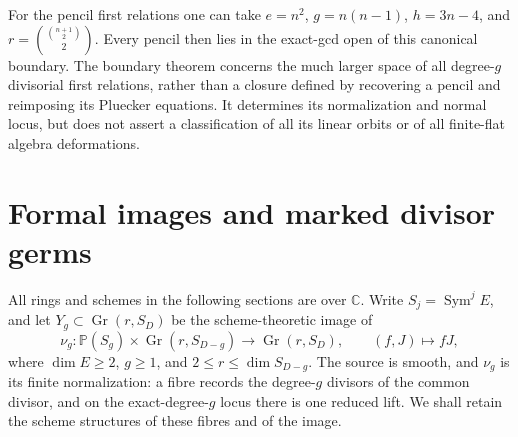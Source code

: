 \documentclass[11pt,reqno]{amsart}
\numberwithin{equation}{section}
\theoremstyle{definition}\newtheorem{definition}[theorem]{Definition}
\theoremstyle{remark}\newtheorem{remark}[theorem]{Remark}
\newcommand{\C}{\mathbb C}\newcommand{\Q}{\mathbb Q}
\newcommand{\Pj}{\mathbb P}\newcommand{\A}{\mathbb A}
\DeclareMathOperator{\Sym}{Sym}\DeclareMathOperator{\Gr}{Gr}
\begin{document}
For the pencil first relations one can take
\(e=n^2\), \(g=n(n-1)\), \(h=3n-4\), and
\(r=\binom{\binom{n+1}{2}}2\).  Every pencil then lies in the
exact-gcd open of this canonical boundary.  The boundary theorem
concerns the much larger space of all degree-\(g\) divisorial first
relations, rather than a closure defined by recovering a pencil and
reimposing its Pluecker equations.  It determines its normalization
and normal locus, but does not assert a classification of all its
linear orbits or of all finite-flat algebra deformations.


\section{Formal images and marked divisor germs}
\label{sec:formal-images-v153}
All rings and schemes in the following sections are over $\C$. Write
$S_j=\Sym^j E$, and let $Y_g\subset\Gr(r,S_D)$ be the
scheme-theoretic image of
\[
 \nu_g:\Pj(S_g)\times\Gr(r,S_{D-g})\longrightarrow\Gr(r,S_D),
 \qquad (f,J)\longmapsto fJ,
\]
where $\dim E\geq2$, $g\geq1$, and $2\leq r\leq\dim S_{D-g}$.
The source is smooth, and $\nu_g$ is its finite normalization: a fibre
records the degree-$g$ divisors of the common divisor, and on the
exact-degree-$g$ locus there is one reduced lift. We shall retain the
scheme structures of these fibres and of the image.
\end{document}
